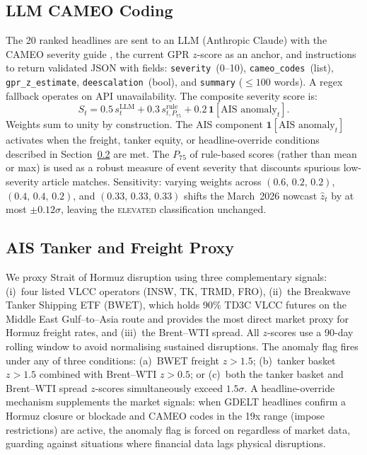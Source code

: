 \documentclass[12pt]{article}
\begin{document}
\subsection{LLM CAMEO Coding}

The 20 ranked headlines are sent to an LLM (Anthropic Claude) with the
CAMEO severity guide \citep{schrodt2009}, the current GPR $z$-score as
an anchor, and instructions to return validated JSON with fields:
\texttt{severity}~(0--10), \texttt{cameo\_codes}~(list),
\texttt{gpr\_z\_estimate}, \texttt{deescalation}~(bool),
and \texttt{summary} ($\leq 100$ words).
A regex fallback operates on API unavailability.
The composite severity score is:
\begin{equation}
S_t = 0.5\,s^{\text{LLM}}_t + 0.3\,s^{\text{rule}}_{t,P_{75}}
    + 0.2\,\mathbf{1}[\text{AIS anomaly}_t].
\label{eq:severity}
\end{equation}
Weights sum to unity by construction.
The AIS component $\mathbf{1}[\text{AIS anomaly}_t]$ activates when
the freight, tanker equity, or headline-override conditions described
in Section~\ref{sec:ais} are met.
The $P_{75}$ of rule-based scores (rather than mean or max) is used
as a robust measure of event severity that discounts spurious
low-severity article matches.
Sensitivity: varying weights across
$(0.6,\,0.2,\,0.2)$, $(0.4,\,0.4,\,0.2)$, and $(0.33,\,0.33,\,0.33)$
shifts the March~2026 nowcast $\hat{z}_t$ by at most $\pm 0.12\sigma$,
leaving the \textsc{elevated} classification unchanged.

\subsection{AIS Tanker and Freight Proxy}\label{sec:ais}

We proxy Strait of Hormuz disruption using three complementary signals:
(i)~four listed VLCC operators (INSW, TK, TRMD, FRO),
(ii)~the Breakwave Tanker Shipping ETF (BWET), which holds 90\%
TD3C VLCC futures on the Middle East Gulf--to--Asia route and
provides the most direct market proxy for Hormuz freight rates,
and (iii)~the Brent--WTI spread.
All $z$-scores use a 90-day rolling window to avoid normalising
sustained disruptions.
The anomaly flag fires under any of three conditions:
(a)~BWET freight $z > 1.5$;
(b)~tanker basket $z > 1.5$ combined with Brent--WTI $z > 0.5$;
or (c)~both the tanker basket and Brent--WTI spread $z$-scores
simultaneously exceed $1.5\sigma$.
A headline-override mechanism supplements the market signals:
when GDELT headlines confirm a Hormuz closure or blockade and
CAMEO codes in the 19x range (impose restrictions) are active,
the anomaly flag is forced on regardless of market data,
guarding against situations where financial data lags physical
disruptions.
\end{document}
